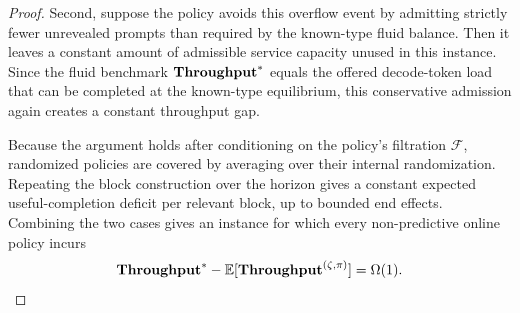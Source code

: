 \begin{proof}
Second, suppose the policy avoids this overflow event by admitting strictly fewer unrevealed prompts than required by the known-type fluid balance. Then it leaves a constant amount of admissible service capacity unused in this instance. Since the fluid benchmark \(\textbf{Throughput}^*\) equals the offered decode-token load that can be completed at the known-type equilibrium, this conservative admission again creates a constant throughput gap.

Because the argument holds after conditioning on the policy's filtration \(\mathcal F\), randomized policies are covered by averaging over their internal randomization. Repeating the block construction over the horizon gives a constant expected useful-completion deficit per relevant block, up to bounded end effects. Combining the two cases gives an instance for which every non-predictive online policy incurs
\[
    \textbf{Throughput}^*-\mathbb E[\textbf{Throughput}^{(\zeta,\pi)}]=\Omega(1).
\]
\end{proof}












